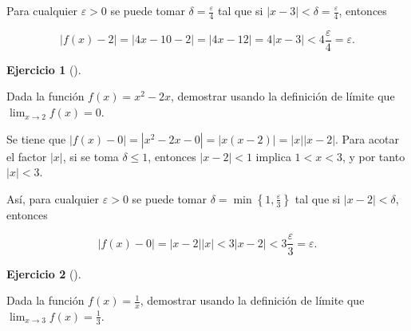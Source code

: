 \documentclass[
  spanish,
  a4paper,
]{scrreport}
\theoremstyle{definition}
\newtheorem{exercise}{Ejercicio}[chapter]
\theoremstyle{remark}
\begin{document}
\begin{tcolorbox}[enhanced jigsaw, arc=.35mm, bottomrule=.15mm, bottomtitle=1mm, breakable, colback=white, colbacktitle=quarto-callout-tip-color!10!white, colframe=quarto-callout-tip-color-frame, coltitle=black, left=2mm, leftrule=.75mm, opacityback=0, opacitybacktitle=0.6, rightrule=.15mm, title=\textcolor{quarto-callout-tip-color}{\faLightbulb}\hspace{0.5em}{Solución}, titlerule=0mm, toprule=.15mm, toptitle=1mm]

Para cualquier \(\varepsilon>0\) se puede tomar
\(\delta = \frac{\varepsilon}{4}\) tal que si
\(|x-3|<\delta=\frac{\varepsilon}{4}\), entonces

\[
|f(x)-2| = |4x-10-2|= |4x-12| = 4|x-3|<4\frac{\varepsilon}{4} =\varepsilon.
\]

\end{tcolorbox}

\begin{exercise}[]\protect\hypertarget{exr-definicion-limite-cuadratica}{}\label{exr-definicion-limite-cuadratica}

Dada la función \(f(x)=x^2-2x\), demostrar usando la definición de
límite que \(\lim_{x\to 2}f(x)=0\).

\end{exercise}

\begin{tcolorbox}[enhanced jigsaw, arc=.35mm, bottomrule=.15mm, bottomtitle=1mm, breakable, colback=white, colbacktitle=quarto-callout-tip-color!10!white, colframe=quarto-callout-tip-color-frame, coltitle=black, left=2mm, leftrule=.75mm, opacityback=0, opacitybacktitle=0.6, rightrule=.15mm, title=\textcolor{quarto-callout-tip-color}{\faLightbulb}\hspace{0.5em}{Solución}, titlerule=0mm, toprule=.15mm, toptitle=1mm]

Se tiene que \(|f(x)-0| = |x^2-2x-0| = |x(x-2)| = |x||x-2|\). Para
acotar el factor \(|x|\), si se toma \(\delta\leq 1\), entonces
\(|x-2|<1\) implica \(1<x<3\), y por tanto \(|x|<3\).

Así, para cualquier \(\varepsilon>0\) se puede tomar
\(\delta = \min\left\{1,\frac{\varepsilon}{3}\right\}\) tal que si
\(|x-2|<\delta\), entonces

\[
|f(x)-0| = |x-2||x| < 3|x-2| < 3\frac{\varepsilon}{3} = \varepsilon.
\]

\end{tcolorbox}

\begin{exercise}[]\protect\hypertarget{exr-definicion-limite-racional}{}\label{exr-definicion-limite-racional}

Dada la función \(f(x)=\frac{1}{x}\), demostrar usando la definición de
límite que \(\lim_{x\to 3}f(x)=\frac{1}{3}\).

\end{exercise}
\end{document}
